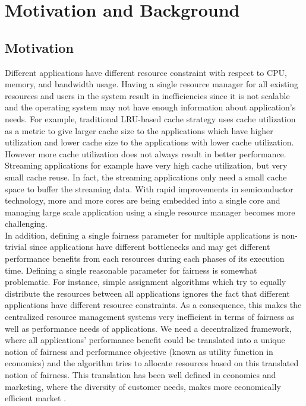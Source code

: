 \section{Motivation and Background} \label{Motivation}
\subsection{Motivation}
Different applications have different resource constraint with respect to CPU, memory, and bandwidth usage. Having a single resource manager for all existing resources and users in the system result in inefficiencies since it is not scalable and the operating system may not have enough information about application's needs. For example, traditional LRU-based cache strategy uses cache utilization as a metric to give larger cache size to the applications which have higher utilization and lower cache size to the applications with lower cache utilization. However more cache utilization does not always result in better performance. Streaming applications for example have very high cache utilization, but very small cache reuse. In fact, the streaming applications only need a small cache space to buffer the streaming data. With rapid improvements in semiconductor technology, more and more cores are being embedded into a single core and managing large scale application using a single resource manager becomes more challenging. \\
\indent In addition, defining a single fairness parameter for multiple applications is non-trivial since applications have different bottlenecks and may get different performance benefits from each resources during each phases of its execution time. Defining a single reasonable parameter for fairness is somewhat problematic. For instance, simple assignment algorithms which try to equally distribute the resources between all applications ignores the fact that different applications have different resource constraints. As a consequence, this makes the centralized resource management systems very inefficient in terms of fairness as well as performance needs of applications. We need a decentralized framework, where all applications' performance benefit could be translated into a unique notion of fairness and performance objective (known as utility function in economics) and the algorithm tries to allocate resources based on this translated notion of fairness. This translation has been well defined in economics and marketing, where the diversity of customer needs, makes more economically efficient market \cite{zhou2014sharing}.\\
